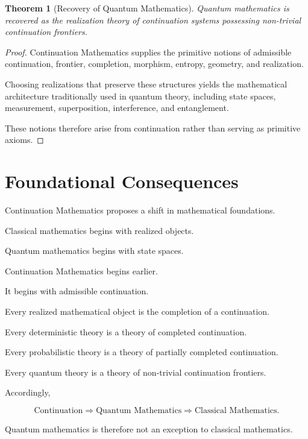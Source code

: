 \documentclass[13pt,openany]{book}
\theoremstyle{plain}
\newtheorem{theorem}{Theorem}[chapter]
\theoremstyle{definition}
\begin{document}
\begin{theorem}[Recovery of Quantum Mathematics]
Quantum mathematics is recovered as the realization theory of continuation
systems possessing non-trivial continuation frontiers.
\end{theorem}

\begin{proof}
Continuation Mathematics supplies the primitive notions of admissible
continuation, frontier, completion, morphism, entropy, geometry, and
realization.

Choosing realizations that preserve these structures yields the mathematical
architecture traditionally used in quantum theory, including state spaces,
measurement, superposition, interference, and entanglement.

These notions therefore arise from continuation rather than serving as
primitive axioms.
\end{proof}

\section{Foundational Consequences}

Continuation Mathematics proposes a shift in mathematical foundations.

Classical mathematics begins with realized objects.

Quantum mathematics begins with state spaces.

Continuation Mathematics begins earlier.

It begins with admissible continuation.

Every realized mathematical object is the completion of a continuation.

Every deterministic theory is a theory of completed continuation.

Every probabilistic theory is a theory of partially completed continuation.

Every quantum theory is a theory of non-trivial continuation frontiers.

Accordingly,

\[
\boxed{
\text{Continuation}
\Longrightarrow
\text{Quantum Mathematics}
\Longrightarrow
\text{Classical Mathematics}.
}
\]

Quantum mathematics is therefore not an exception to classical mathematics.
\end{document}
